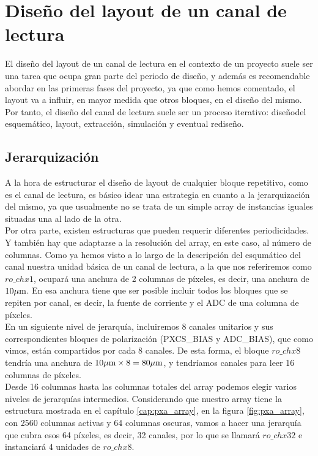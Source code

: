 \chapter{Diseño del layout de un canal de lectura}

El diseño del layout de un canal de lectura en el contexto de un proyecto suele
ser una tarea que ocupa gran parte del periodo de diseño, y además es recomendable
abordar en las primeras fases del proyecto, ya que como hemos comentado, el
layout va a influir, en mayor medida que otros bloques, en el diseño del mismo.
Por tanto, el diseño del canal de lectura suele ser un proceso iterativo:
diseñodel esquemático, layout, extracción, simulación y eventual rediseño.\\

\section{Jerarquización}

A la hora de estructurar el diseño de layout de cualquier bloque repetitivo, como
es el canal de lectura, es básico idear una estrategia en cuanto a la jerarquización
del mismo, ya que usualmente no se trata de un simple array de instancias iguales
situadas una al lado de la otra.\\

Por otra parte, existen estructuras que pueden requerir diferentes periodicidades.
Y también hay que adaptarse a la resolución del array, en este caso, al número de
columnas. Como ya hemos visto a lo largo de la descripción del esqumático del canal
nuestra unidad básica de un canal de lectura, a la que nos referiremos como
$ro\_chx1$, ocupará una anchura de 2 columnas de píxeles, es decir, una anchura
de $10\mu\text{m}$. En esa anchura tiene que ser posible incluir todos los bloques que
se repiten por canal, es decir, la fuente de corriente y el ADC de una columna de
píxeles.\\

En un siguiente nivel de jerarquía, incluiremos 8 canales unitarios y sus
correspondientes bloques de polarización (PXCS\_BIAS y ADC\_BIAS), que como vimos,
están compartidos por cada 8 canales. De esta forma, el bloque $ro\_chx8$
tendría una anchura de $10\mu\text{m} \times 8 = 80\mu\text{m}$, y tendríamos canales para
leer 16 columnas de píxeles.\\

Desde 16 columnas hasta las columnas totales del array podemos elegir varios niveles
de jerarquías intermedios. Considerando que nuestro array tiene la estructura
mostrada en el capítulo \ref{cap:pxa_array}, en la figura \ref{fig:pxa_array},
con 2560 columnas activas y 64 columnas oscuras, vamos a hacer una jerarquía que
cubra esos 64 píxeles, es decir, 32 canales, por lo que se llamará $ro\_chx32$ e
instanciará 4 unidades de $ro\_chx8$.\\

